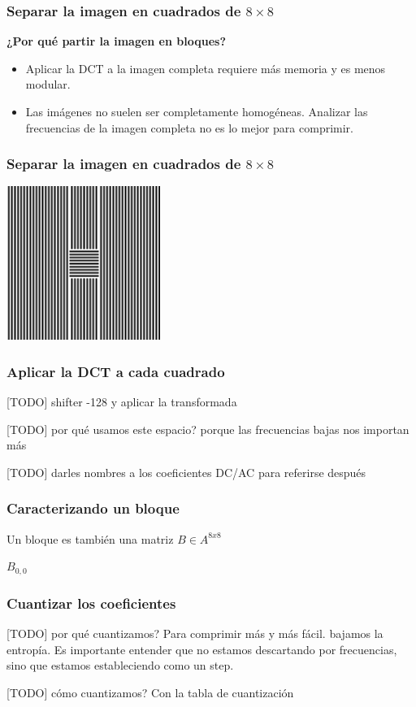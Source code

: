 \documentclass{beamer}
\begin{document}
\begin{frame}
    \frametitle{Separar la imagen en cuadrados de $8 \times 8$}
    \textbf{¿Por qué partir la imagen en bloques?}
    \begin{itemize}
        \item Aplicar la DCT a la imagen completa requiere más memoria y es menos modular. %
        \item Las imágenes no suelen ser completamente homogéneas. Analizar las frecuencias de la imagen completa no es lo mejor para comprimir.
    \end{itemize}
\end{frame}

\begin{frame}
    \frametitle{Separar la imagen en cuadrados de $8 \times 8$}
    \includegraphics[width=5cm, height=5cm]{fig/no_homogenea.png}
\end{frame}

\begin{frame}
    \frametitle{Aplicar la DCT a cada cuadrado}
    [TODO] shifter -128 y aplicar la transformada

    [TODO] por qué usamos este espacio? porque las frecuencias bajas nos importan más

    [TODO] darles nombres a los coeficientes DC/AC para referirse después
\end{frame}

\begin{frame}
    \frametitle{Caracterizando un bloque}
    Un bloque es también una matriz $B \in A^{8x8}$

    \vspace{5mm}
    $B_{0,0}$
    

    
\end{frame}

\begin{frame}
    \frametitle{Cuantizar los coeficientes}
    [TODO] por qué cuantizamos? Para comprimir más y más fácil. bajamos la entropía.
    Es importante entender que no estamos descartando por frecuencias, sino
    que estamos estableciendo como un step.

    [TODO] cómo cuantizamos? Con la tabla de cuantización
\end{frame}
\end{document}
